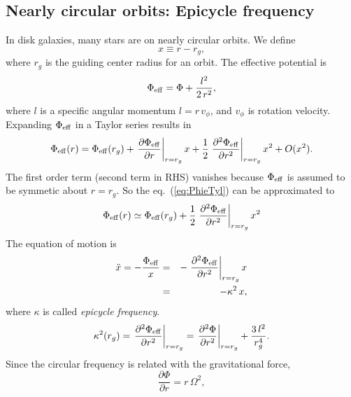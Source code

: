 \subsection{Nearly circular orbits: Epicycle frequency}
In disk galaxies, many stars are on nearly circular orbits. We define
\begin{equation}
   x \equiv r - r_{g},
\end{equation}
where $r_{g}$ is the guiding center radius for an orbit.
The effective potential is 
\begin{equation}
   \Phi_{\rm eff} = \Phi + \frac{l^{2}}{2\,r^{2}},
\end{equation}
where $l$ is a specific angular momentum $l = r\,v_{\phi}$, and $v_{\phi}$ is rotation velocity.
Expanding $\Phi_{\rm eff}$ in a Taylor series results in
\begin{equation}\label{eq:PhieTyl}
    \Phi_{\rm eff} (r) = \Phi_{\rm eff}(r_{g}) + \left. \frac{\partial \Phi_{\rm eff}}{\partial r} \right|_{r=r_{g}} x
                    + \frac{1}{2} \left. \frac{\partial^{2} \Phi_{\rm eff}}{\partial r^{2}} \right|_{r=r_{g}} x^{2} + O(x^{2}).
\end{equation}
The first order term (second term in RHS) vanishes because $\Phi_{\rm eff}$ is assumed to be symmetic about $r=r_{g}$.
So the eq.~(\ref{eq:PhieTyl}) can be approximated to 
\begin{equation}
    \Phi_{\rm eff} (r) \simeq \Phi_{\rm eff}(r_{g}) 
                    + \frac{1}{2} \left. \frac{\partial^{2} \Phi_{\rm eff}}{\partial r^{2}} \right|_{r=r_{g}} x^{2} 
\end{equation}
The equation of motion is
\begin{eqnarray}
    \ddot{x} = -\frac{\Phi_{\rm eff}}{x} &=& - \left. \frac{\partial^{2} \Phi_{\rm eff}}{\partial r^{2}} \right|_{r=r_{g}} x \\
             &=& -\kappa^{2}\,x,
\end{eqnarray}
where $\kappa$ is called \emph{epicycle frequency}.
\begin{equation}\label{eq:epi1}
    \kappa^{2}(r_{g}) = \left. \frac{\partial^{2} \Phi_{\rm eff}}{\partial r^{2}} \right|_{r=r_{g}}
             = \left. \frac{\partial^{2} \Phi}{\partial r^{2}} \right|_{r=r_{g}} + \frac{3\,l^{2}}{r_{g}^{4}}.
\end{equation}
Since the circular frequency is related with the gravitational force,
\begin{equation}
    \frac{\partial \Phi}{\partial r} = r\, \Omega^{2},
\end{equation}
